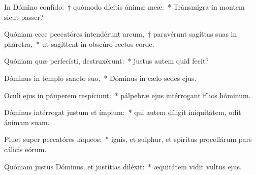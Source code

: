 \item In Dómino confído:~† quómodo dícitis ánimæ meæ:~* Tránsmigra in montem sicut passer?

\item Quóniam ecce peccatóres intendérunt arcum,~† paravérunt sagíttas suas in pháretra,~* ut sagíttent in obscúro rectos corde.

\item Quóniam quæ perfecísti, destruxérunt:~* justus autem quid fecit?

\item Dóminus in templo sancto suo,~* Dóminus in cælo sedes ejus.

\item Oculi ejus in páuperem respíciunt:~* pálpebræ ejus intérrogant fílios hóminum.

\item Dóminus intérrogat justum et ímpium:~* qui autem díligit iniquitátem, odit ánimam suam.

\item Pluet super peccatóres láqueos:~* ignis, et sulphur, et spíritus procellárum pars cálicis eórum.

\item Quóniam justus Dóminus, et justítias diléxit:~* æquitátem vidit vultus ejus.


